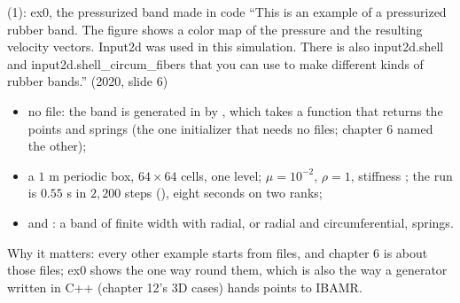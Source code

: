 \documentclass[aspectratio=169,11pt]{beamer}
\begin{document}
\begin{frame}{ (1): ex0, the pressurized band made in code}
\label{fr:ib01}
\footnotesize {} ``This is an example of a pressurized rubber band. The figure shows a color map of the pressure and the resulting velocity vectors. Input2d was used in this simulation. There is also input2d.shell and input2d.shell\_circum\_fibers that you can use to make different kinds of rubber bands.'' (2020, slide 6)
\begin{itemize}\scriptsize
  \item no  file: the band is generated in  by , which takes a function that returns the points and springs (the one initializer that needs no files; chapter 6 named the other);
  \item a $1$ m periodic box, $64\times64$ cells, one level; $\mu = 10^{-2}$, $\rho = 1$, stiffness ; the run is $0.55$ s in $2{,}200$ steps (), eight seconds on two ranks;
  \item {} and : a band of finite width  with radial, or radial and circumferential, springs.
\end{itemize}
\vspace{1mm}

\scriptsize Why it matters: every other example starts from files, and chapter 6 is about those files; ex0 shows the one way round them, which is also the way a generator written in C++ (chapter 12's 3D cases) hands points to IBAMR.
\end{frame}
\end{document}
